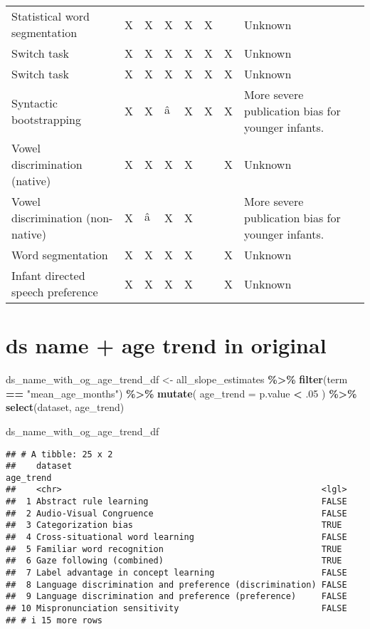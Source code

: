 \documentclass[
]{article}
\newenvironment{Shaded}{\begin{snugshade}}{\end{snugshade}}
\newcommand{\AttributeTok}[1]{\textcolor[rgb]{0.13,0.29,0.53}{#1}}
\newcommand{\DecValTok}[1]{\textcolor[rgb]{0.00,0.00,0.81}{#1}}
\newcommand{\FunctionTok}[1]{\textcolor[rgb]{0.13,0.29,0.53}{\textbf{#1}}}
\newcommand{\NormalTok}[1]{#1}
\newcommand{\OtherTok}[1]{\textcolor[rgb]{0.56,0.35,0.01}{#1}}
\newcommand{\SpecialCharTok}[1]{\textcolor[rgb]{0.81,0.36,0.00}{\textbf{#1}}}
\newcommand{\StringTok}[1]{\textcolor[rgb]{0.31,0.60,0.02}{#1}}
\begin{document}
\begin{tabular}{llllllll}
Statistical word segmentation & X & X & X & X & X &  & Unknown\\
Switch task & X & X & X & X & X & X & Unknown\\
\addlinespace
Switch task & X & X & X & X & X & X & Unknown\\
Syntactic bootstrapping & X & X & â & X & X & X & More severe publication bias for younger infants.\\
Vowel discrimination (native) & X & X & X & X &  & X & Unknown\\
Vowel discrimination (non-native) & X & â & X & X &  &  & More severe publication bias for younger infants.\\
Word segmentation & X & X & X & X &  & X & Unknown\\
\addlinespace
Infant directed speech preference & X & X & X & X &  & X & Unknown\\
\bottomrule
\end{tabular}

\hypertarget{ds-name-age-trend-in-original}{%
\section{ds name + age trend in
original}\label{ds-name-age-trend-in-original}}

\begin{Shaded}
\begin{Highlighting}[]
\NormalTok{ds\_name\_with\_og\_age\_trend\_df }\OtherTok{\textless{}{-}}\NormalTok{ all\_slope\_estimates }\SpecialCharTok{\%\textgreater{}\%} 
  \FunctionTok{filter}\NormalTok{(term }\SpecialCharTok{==} \StringTok{"mean\_age\_months"}\NormalTok{) }\SpecialCharTok{\%\textgreater{}\%} 
  \FunctionTok{mutate}\NormalTok{(}
    \AttributeTok{age\_trend =}\NormalTok{ p.value }\SpecialCharTok{\textless{}}\NormalTok{ .}\DecValTok{05}
\NormalTok{  ) }\SpecialCharTok{\%\textgreater{}\%} 
  \FunctionTok{select}\NormalTok{(dataset, age\_trend)}

\NormalTok{ds\_name\_with\_og\_age\_trend\_df}
\end{Highlighting}
\end{Shaded}

\begin{verbatim}
## # A tibble: 25 x 2
##    dataset                                                 age_trend
##    <chr>                                                   <lgl>    
##  1 Abstract rule learning                                  FALSE    
##  2 Audio-Visual Congruence                                 FALSE    
##  3 Categorization bias                                     TRUE     
##  4 Cross-situational word learning                         FALSE    
##  5 Familiar word recognition                               TRUE     
##  6 Gaze following (combined)                               TRUE     
##  7 Label advantage in concept learning                     FALSE    
##  8 Language discrimination and preference (discrimination) FALSE    
##  9 Language discrimination and preference (preference)     FALSE    
## 10 Mispronunciation sensitivity                            FALSE    
## # i 15 more rows
\end{verbatim}
\end{document}
